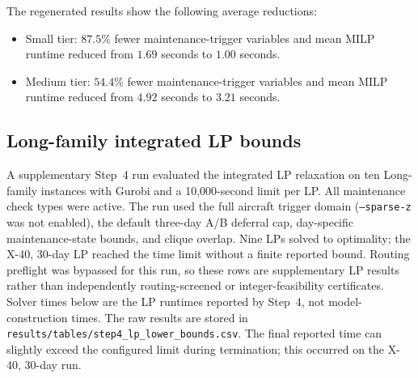 The regenerated results show the following average reductions:
\begin{itemize}
    \item Small tier: $87.5\%$ fewer maintenance-trigger variables and mean
    MILP runtime reduced from $1.69$ seconds to $1.00$ seconds.
    \item Medium tier: $54.4\%$ fewer maintenance-trigger variables and mean
    MILP runtime reduced from $4.92$ seconds to $3.21$ seconds.
\end{itemize}

\subsection{Long-family integrated LP bounds}

A supplementary Step~4 run evaluated the integrated LP relaxation on ten
Long-family instances with Gurobi and a 10{,}000-second limit per LP. All
maintenance check types were active. The run used the full aircraft trigger
domain (\texttt{--sparse-z} was not enabled), the default three-day A/B
deferral cap, day-specific maintenance-state bounds, and clique overlap. Nine
LPs solved to optimality; the X-40, 30-day LP reached the time limit without a
finite reported bound. Routing preflight was bypassed for this run, so these
rows are supplementary LP results rather than independently routing-screened
or integer-feasibility certificates. Solver times below are the LP runtimes
reported by Step~4, not model-construction times. The raw results are stored in
\texttt{results/tables/step4\_lp\_lower\_bounds.csv}. The final reported time
can slightly exceed the configured limit during termination; this occurred on
the X-40, 30-day run.

